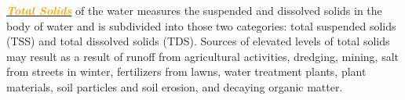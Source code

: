 \documentclass{article}
\newcommand{\orange}[1]{\textcolor{orange}{#1}}
\newcommand{\mysubsection}[1]{\underline{\textbf{{\textit{\orange{#1}}}}}}
\begin{document}
\begin{multicols*}{4}
        \mysubsection{Total Solids} of the water measures the suspended and dissolved solids in the body of water and is subdivided into those two categories: total suspended solids (TSS) and total dissolved solids (TDS). Sources of elevated levels of total solids may result as a result of runoff from agricultural activities, dredging, mining, salt from streets in winter, fertilizers from lawns, water treatment plants, plant materials, soil particles and soil erosion, and decaying organic matter.
        
\end{multicols*}
\end{document}

